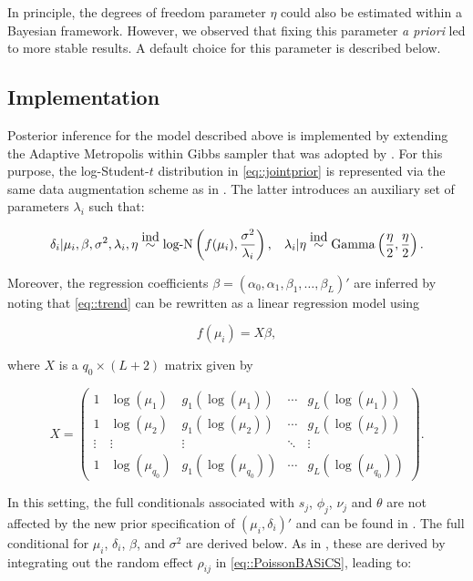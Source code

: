In principle, the degrees of freedom parameter $\eta$ could also be estimated within a Bayesian framework. However, we observed that fixing this parameter \emph{a priori} led to more stable results. A default choice for this parameter is described below.

\subsection{Implementation}

Posterior inference for the model described above is implemented by extending the Adaptive Metropolis within Gibbs sampler \citep{Roberts2009} that was adopted by \cite{Vallejos2016}. For this purpose, the log-Student-$t$ distribution in \ref{eq::jointprior} is represented via the same data augmentation scheme as in \cite{Vallejos2015}. The latter introduces an auxiliary set of parameters $\lambda_i$ such that:

\begin{equation}
\delta_i| \mu_i,\beta,\sigma^2, \lambda_i, \eta \stackrel{\mbox{ind}}{\sim} \textnormal{log-N}\left( f(\mu_i),\frac{\sigma^2}{\lambda_i} \right), \hspace{0.3cm} \lambda_i|\eta \stackrel{\mbox{ind}}{\sim} \text{Gamma}\left(\frac{\eta}{2},\frac{\eta}{2}\right).
\end{equation} 

Moreover, the regression coefficients $\beta = (\alpha_0, \alpha_1, \beta_1, \ldots, \beta_L)'$ are inferred by noting that \ref{eq::trend} can be rewritten as a linear regression model using 

\begin{equation} \label{eq::trend2} f(\mu_i) = X \beta, \end{equation} 

where $X$ is a $q_0 \times (L+2)$ matrix given by 

\begin{equation} \label{eq::X} X = \left( \begin{array}{ccccc}
1 & \log(\mu_1) & g_1(\log(\mu_1)) & \cdots & g_L(\log(\mu_1)) \\
1 & \log(\mu_2) & g_1(\log(\mu_2)) & \cdots & g_L(\log(\mu_2)) \\
\vdots & \vdots & \vdots & \ddots & \vdots  \\
1 & \log(\mu_{q_0}) & g_1(\log(\mu_{q_0})) & \cdots & g_L(\log(\mu_{q_0}))
\end{array}\right).\end{equation}

In this setting, the full conditionals associated with $s_j$, $\phi_j$, $\nu_j$ and $\theta$ are not affected by the new prior specification of $(\mu_i, \delta_i)'$ and can be found in \cite{Vallejos2016}. The full conditional for $\mu_i$, $\delta_i$, $\beta$, and $\sigma^2$ are derived below. As in \cite{Vallejos2015BASiCS}, these are derived by integrating out the random effect $\rho_{ij}$ in \ref{eq::PoissonBASiCS}, leading to:

